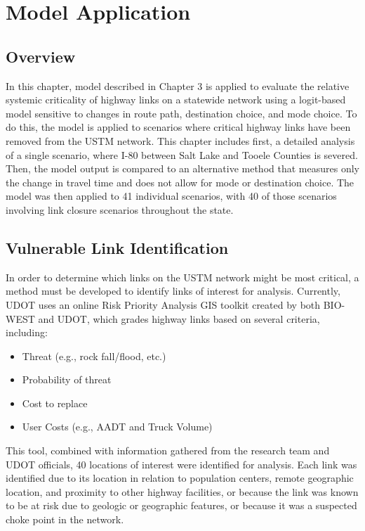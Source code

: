\chapter{Model Application}
\label{chp:chapter4}
\graphicspath{{figures/}{figures/chapter4/}}

\section{Overview}
In this chapter, model described in Chapter 3 is applied to evaluate the relative systemic
criticality of highway links on a statewide network using a logit-based model
sensitive to changes in route path, destination choice, and mode choice. To do this, the model is applied to scenarios
where critical highway links have been removed from the USTM network. This
chapter includes first, a detailed analysis of a single scenario, where I-80
between Salt Lake and Tooele Counties is severed. Then, the model
output is compared to an alternative method that measures only the change in travel
time and does not allow for mode or destination choice. The model was then
applied to 41 individual scenarios, with 40 of those scenarios involving link
closure scenarios throughout the state.

\section{Vulnerable Link Identification}
In order to determine which links on the USTM network might be most critical,
a method must be developed to identify links of interest for analysis. Currently, UDOT uses
an online Risk Priority Analysis GIS toolkit created by both BIO-WEST and UDOT,
which grades highway links based on several criteria, including:

\begin{itemize}
   \item {Threat (e.g., rock fall/flood, etc.)}
   \item {Probability of threat}
   \item {Cost to replace}
   \item {User Costs (e.g., AADT and Truck Volume)}
\end{itemize}

\noindent This tool, combined with information gathered from the research team and UDOT
officials, 40 locations of interest were identified for analysis. Each link was
identified due to its location in relation to
population centers, remote geographic location, and proximity to other highway
facilities, or because the link was known to be at risk due to geologic or geographic features, or
because it was a suspected choke point in the network.

